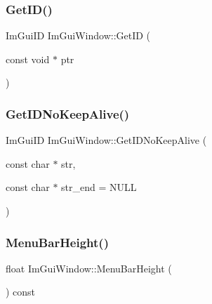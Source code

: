 \hypertarget{struct_im_gui_window_aae21dffb343cabca9414499b827912a8}{}\label{struct_im_gui_window_aae21dffb343cabca9414499b827912a8} 
\subsubsection{\texorpdfstring{Get\+I\+D()}{GetID()}\hspace{0.1cm}{\footnotesize\ttfamily [2/2]}}
{\footnotesize\ttfamily Im\+Gui\+ID Im\+Gui\+Window\+::\+Get\+ID (\begin{DoxyParamCaption}\item[{const void $\ast$}]{ptr }\end{DoxyParamCaption})}

\hypertarget{struct_im_gui_window_adc0a43f74a0b53a15a4bc4fea05524fe}{}\label{struct_im_gui_window_adc0a43f74a0b53a15a4bc4fea05524fe} 
\subsubsection{\texorpdfstring{Get\+I\+D\+No\+Keep\+Alive()}{GetIDNoKeepAlive()}}
{\footnotesize\ttfamily Im\+Gui\+ID Im\+Gui\+Window\+::\+Get\+I\+D\+No\+Keep\+Alive (\begin{DoxyParamCaption}\item[{const char $\ast$}]{str,  }\item[{const char $\ast$}]{str\+\_\+end = {\ttfamily NULL} }\end{DoxyParamCaption})}

\hypertarget{struct_im_gui_window_acfb8bdad2e3ea6102589813ae32d0364}{}\label{struct_im_gui_window_acfb8bdad2e3ea6102589813ae32d0364} 
\subsubsection{\texorpdfstring{Menu\+Bar\+Height()}{MenuBarHeight()}}
{\footnotesize\ttfamily float Im\+Gui\+Window\+::\+Menu\+Bar\+Height (\begin{DoxyParamCaption}{ }\end{DoxyParamCaption}) const}

